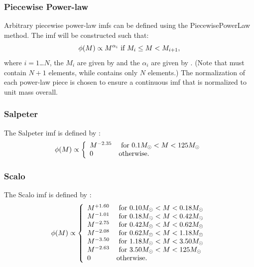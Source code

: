 \subsubsection{Piecewise Power-law}

Arbitrary piecewise power-law {\gls{imf}}s can be defined using the {\normalfont \ttfamily PiecewisePowerLaw} method. The \gls{imf} will be constructed such that:
\begin{equation}
 \phi(M) \propto M^{\alpha_i} \hbox{ if } M_i \le M < M_{i+1},
\end{equation}
where $i=1$\ldots$N$, the $M_i$ are given by {\normalfont \ttfamily [imfPiecewisePowerLawMassPoints]} and the $\alpha_i$ are given by {\normalfont \ttfamily [imfPiecewisePowerLawExponents]}. (Note that {\normalfont \ttfamily [imfPiecewisePowerLawMassPoints]} must contain $N+1$ elements, while {\normalfont \ttfamily [imfPiecewisePowerLawExponents]} contains only $N$ elements.) The normalization of each power-law piece is chosen to ensure a continuous \gls{imf} that is normalized to unit mass overall.

\subsubsection{Salpeter}

The {\normalfont \ttfamily Salpeter} \gls{imf} is defined by \citep{salpeter_luminosity_1955}:
\begin{equation}
 \phi(M) \propto \left\{ \begin{array}{ll} M^{-2.35} & \hbox{ for } 0.1M_\odot < M < 125M_\odot \\ 0 & \hbox {otherwise.} \end{array} \right.
\end{equation}

\subsubsection{Scalo}

The {\normalfont \ttfamily Scalo} \gls{imf} is defined by \citep{scalo_stellar_1986}:
\begin{equation}
 \phi(M) \propto \left\{ \begin{array}{ll}
 M^{+1.60} & \hbox{ for } 0.10M_\odot < M < 0.18M_\odot \\
 M^{-1.01} & \hbox{ for } 0.18M_\odot < M < 0.42M_\odot \\
 M^{-2.75} & \hbox{ for } 0.42M_\odot < M < 0.62M_\odot \\
 M^{-2.08} & \hbox{ for } 0.62M_\odot < M < 1.18M_\odot \\
 M^{-3.50} & \hbox{ for } 1.18M_\odot < M < 3.50M_\odot \\
 M^{-2.63} & \hbox{ for } 3.50M_\odot < M < 125M_\odot \\
 0 & \hbox {otherwise.} \end{array} \right.
\end{equation}

